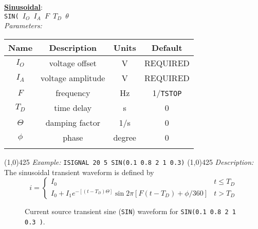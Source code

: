 \underline{\bf{Sinusoidal}}:\\
\texttt{SIN( $I_O$ $I_A$ \B $F$ \E \B $T_D$ \E \B $\theta$ \E {\tt )}}\\
\textit{Parameters:}
\begin{table}[h]
\begin{tabular}{|c|c|c|c|}
\hline
Name&Description&Units&Default\\
\hline
$I_O$ & voltage offset & V & \scriptsize{REQUIRED}\\
\hline
$I_A$ & voltage amplitude & V & \scriptsize{REQUIRED}\\
\hline
$F$ & frequency & Hz & 1/{\texttt{TSTOP}}\\
\hline
$T_D$ & time delay & s & 0\\
\hline
$\Theta$ & damping factor & 1/s & 0\\
\hline
$\phi$ & phase & degree & 0\\
\par
\hline
\end{tabular}
\end{table}
\newline
\linethickness{0.5mm} \line(1,0){425}
\newline
\textit{Example:}
\newline
\texttt{ISIGNAL 20 5 SIN(0.1 0.8 2 1 0.3)}
\newline
\linethickness{0.5mm} \line(1,0){425}
\newline
\textit{Description:}\\
The sinusoidal transient waveform is defined by
\begin{equation}
i = \left\{ \begin{array}{ll}
I_0                         & t \le T_D\\
I_0 + I_1 e^{-[\textstyle (t -T_D)\Theta]} \sin{2\pi[F(t-T_D) +
\phi/360]}
                            & t > T_D
\end{array} \right. %
\end{equation}
\begin{figure}[h]
\centering

\caption[Current source transient sine ({\tt SIN})
waveform]{Current source transient sine ({\tt SIN}) waveform
for\newline \hspace*{\fill} {\tt SIN(0.1 0.8 2 1 0.3 )}.
\label{fig:isin} \hspace*{\fill} }
\end{figure}
\newline
\newline

